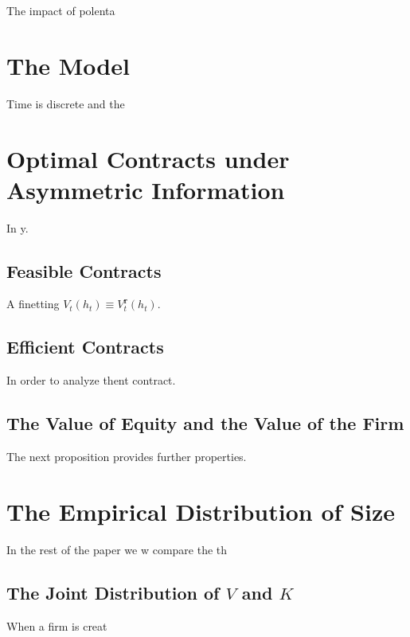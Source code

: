 \documentclass[12pt]{article}
\begin{document}
\label{literature} The impact of polenta

\section{The Model}

\label{model} Time is discrete and the 

\section{Optimal Contracts under Asymmetric Information}

\label{incomplete} In y.

\subsection{Feasible Contracts}

\label{feasible} A finetting $V_t( h_t) \equiv V_t^{\mathbf{r}}( h_t) $.

\subsection{Efficient Contracts}

In order to analyze thent contract.

\subsection{The Value of Equity and the Value of the Firm}

\label{prelim} The next proposition provides further properties.

\section{The Empirical Distribution of Size}

\label{sizerelevance} In the rest of the paper we w compare the th
\subsection{The Joint Distribution of $V$ and $K$}

When a firm is creat
\end{document}
